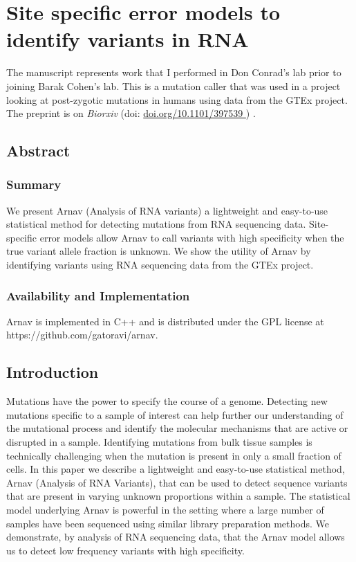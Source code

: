 
\chapter{Site specific error models to identify variants in RNA}
\label{chap:appendix A}

\vspace{2in}

The manuscript represents work that I performed in Don Conrad's lab prior to joining Barak Cohen's lab. This is a mutation caller that was used in a project looking at post-zygotic mutations in humans using data from the GTEx project. The preprint is on \textit{Biorxiv} (doi: \href{https://www.biorxiv.org/content/10.1101/397539v1}{doi.org/10.1101/397539 }) \cite{ramu2018a}.

\newpage

\section{Abstract}

\subsection{Summary}
We present Arnav (Analysis of RNA variants) a lightweight and easy-to-use statistical method for detecting mutations from RNA sequencing data. Site-specific error models allow Arnav to call variants with high specificity when the true variant allele fraction is unknown. We show the utility of Arnav by identifying variants using RNA sequencing data from the GTEx project.

\subsection{Availability and Implementation} 
Arnav is implemented in C++ and is distributed under the GPL license at https://github.com/gatoravi/arnav.

\section{Introduction}
Mutations have the power to specify the course of a genome. Detecting new mutations specific to a sample of interest can help further our understanding of the mutational process and identify the molecular mechanisms that are active or disrupted in a sample. Identifying mutations from bulk tissue samples is technically challenging when the mutation is present in only a small fraction of cells. In this paper we describe a lightweight and easy-to-use statistical method, Arnav (Analysis of RNA Variants), that can be used to detect sequence variants that are present in varying unknown proportions within a sample. The statistical model underlying Arnav is powerful in the setting where a large number of samples have been sequenced using similar library preparation methods. We demonstrate, by analysis of RNA sequencing data, that the Arnav model allows us to detect low frequency variants with high specificity.

